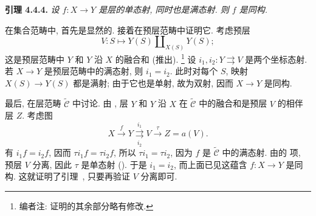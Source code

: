 \medskip
\noindent{}\textbf{引理 4.4.4.}
\textit{设 \(f:X\to Y\) 是层的单态射, 同时也是满态射. 则 \(f\) 是同构.}

在集合范畴中, 首先是显然的.
接着在预层范畴中证明它. 考虑预层
\[
  V:S\longmapsto Y(S)\amalg_{X(S)}Y(S);
\]
这是预层范畴中 \(Y\) 和 \(Y\) 沿 \(X\) 的融合和 (推出).
\footnote{编者注: 证明的其余部分略有修改.}
设 \(i_1,i_2:Y\rightrightarrows V\) 是两个坐标态射.
若 \(X\to Y\) 是预层范畴中的满态射, 则 \(i_1=i_2\).
此时对每个 \(S\), 映射 \(X(S)\to Y(S)\) 都是满射;
由于它也是单射, 故为双射, 因而 \(X\to Y\) 是同构.

最后, 在层范畴 \(\widetilde{\mathscr C}\) 中讨论.
由 ,
层 \(Y\) 和 \(Y\) 沿 \(X\) 在 \(\widetilde{\mathscr C}\)
中的融合和是预层 \(V\) 的相伴层 \(Z\). 考虑图
\[
  X\xrightarrow{f}Y
  \overset{i_1}{\underset{i_2}{\rightrightarrows}}
  V\xrightarrow{\tau}Z=a(V).
\]
有 \(i_1f=i_2f\), 因而 \(\tau i_1f=\tau i_2f\),
所以 \(\tau i_1=\tau i_2\), 因为 \(f\) 是
\(\widetilde{\mathscr C}\) 中的满态射.
由的
 项,
预层 \(V\) 分离, 因此 \(\tau\) 是单态射
().
于是 \(i_1=i_2\), 而上面已见这蕴含 \(f:X\to Y\) 是同构.
这就证明了引理~,
只要再验证 \(V\) 分离即可.

